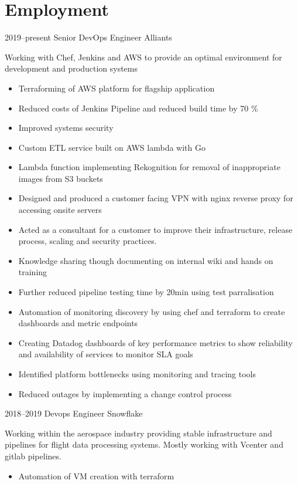 \documentclass[]{friggeri-cv-a4}
\begin{document}
\section{Employment}
 \begin{entrylist}
   \entry
  	{2019--present}
  	{Senior DevOps Engineer}
  	{Alliants}
  	{
      Working with Chef, Jenkins and AWS to provide an optimal environment for development and production systems
      \begin{itemize}
        \item Terraforming of AWS platform for flagship application
        \item Reduced costs of Jenkins Pipeline and reduced build time by 70 \%
        \item Improved systems security
        \item Custom ETL service built on AWS lambda with Go
        \item Lambda function implementing Rekognition for removal of inappropriate images from S3 buckets
        \item Designed and produced a customer facing VPN with nginx reverse proxy for accessing onsite servers
        \item Acted as a consultant for a customer to improve their infrastructure, release process, scaling and security practices. 
        \item Knowledge sharing though documenting on internal wiki and hands on training
        \item Further reduced pipeline testing time by 20min using test parralisation
        \item Automation of monitoring discovery by using chef and terraform to create dashboards and metric endpoints
        \item Creating Datadog dashboards of key performance metrics to show reliability and availability of services to monitor SLA goals
        \item Identified platform bottlenecks using monitoring and tracing tools
        \item Reduced outages by implementing a change control process
      \end{itemize}
    }
   \entry
  	{2018--2019}
  	{Devops Engineer}
  	{Snowflake}
  	{
      Working within the aerospace industry providing stable infrastructure and pipelines for flight data processing systems. Mostly working with Vcenter and gitlab pipelines.
      \begin{itemize}
        \item Automation of VM creation with terraform

\end{itemize}}
\end{entrylist}
\end{document}
